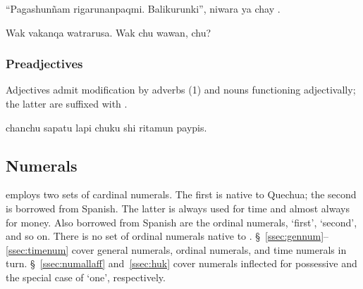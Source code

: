 {%
{``Pagashun\~nam rigarunanpaqmi. Balikurunki'', niwara ya chay  .}%
{}%
{}{}%

%
{Wak vakanqa watrarusa. \textquestiondown{}Wak chu wawan, chu?}%
{}%
{}{}%

\subsubsection{Preadjectives}\label{ssec:preadj}
Adjectives admit modification by adverbs (1) and nouns functioning adjectivally; the latter are suffixed with .

%
{ chanchu sapatu  lapi chuku shi ritamun paypis.}%
{}%
{}{}%

\subsection{Numerals}\label{sec:numerals}
\SYQ{} employs two sets of cardinal numerals. The first is native to Quechua; the second is borrowed from Spanish. The latter is always used for time and almost always for money. Also borrowed from Spanish are the ordinal numerals,  `first',  `second', and so on. There is no set of ordinal numerals native to \SYQ{}. \S~\ref{ssec:gennum}--\ref{ssec:timenum} cover general numerals, ordinal numerals, and time numerals in turn. \S~\ref{ssec:numallaff} and~\ref{ssec:huk} cover numerals inflected for possessive and the special case of  `one', respectively.

}
